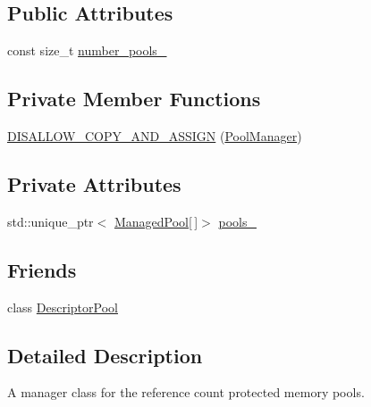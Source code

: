\subsection*{Public Attributes}
\begin{DoxyCompactItemize}
\item 
const size\+\_\+t \hyperlink{classtervel_1_1util_1_1memory_1_1rc_1_1_pool_manager_aabebb2e05664becf83a3f494160a721f}{number\+\_\+pools\+\_\+}
\end{DoxyCompactItemize}
\subsection*{Private Member Functions}
\begin{DoxyCompactItemize}
\item 
\hyperlink{classtervel_1_1util_1_1memory_1_1rc_1_1_pool_manager_a48a378be0c58138b34b32d9fa6fed4c8}{D\+I\+S\+A\+L\+L\+O\+W\+\_\+\+C\+O\+P\+Y\+\_\+\+A\+N\+D\+\_\+\+A\+S\+S\+I\+G\+N} (\hyperlink{classtervel_1_1util_1_1memory_1_1rc_1_1_pool_manager}{Pool\+Manager})
\end{DoxyCompactItemize}
\subsection*{Private Attributes}
\begin{DoxyCompactItemize}
\item 
std\+::unique\+\_\+ptr$<$ \hyperlink{structtervel_1_1util_1_1memory_1_1rc_1_1_pool_manager_1_1_managed_pool}{Managed\+Pool}\mbox{[}$\,$\mbox{]}$>$ \hyperlink{classtervel_1_1util_1_1memory_1_1rc_1_1_pool_manager_a69430218cf6f7b1dac677ae64f14f77c}{pools\+\_\+}
\end{DoxyCompactItemize}
\subsection*{Friends}
\begin{DoxyCompactItemize}
\item 
class \hyperlink{classtervel_1_1util_1_1memory_1_1rc_1_1_pool_manager_a580b2e7743fb5db76d84a307272a3cec}{Descriptor\+Pool}
\end{DoxyCompactItemize}


\subsection{Detailed Description}
A manager class for the reference count protected memory pools. 

